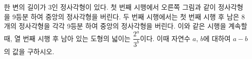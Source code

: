 \noindent\begin{minipage}[t]{0.58\linewidth}\vspace{0pt}\raggedright 한 변의 길이가 $3$인 정사각형이 있다. 첫 번째 시행에서 오른쪽 그림과 같이 정사각형을 9등분 하여 중앙의 정사각형을 버린다. 두 번째 시행에서는 첫 번째 시행 후 남은 8개의 정사각형을 각각 9등분 하여 중앙의 정사각형을 버린다. 이와 같은 시행을 계속할 때, 열 번째 시행 후 남아 있는 도형의 넓이는 $\dfrac{2^{a}}{3^{b}}$이다. 이때 자연수 $a$, $b$에 대하여 $a-b$의 값을 구하시오.\end{minipage}\hfill\begin{minipage}[t]{0.4\linewidth}\vspace{0pt}\centering \resizebox{\ifdim\width>\linewidth\linewidth\else\width\fi}{!}{}\end{minipage}\par
